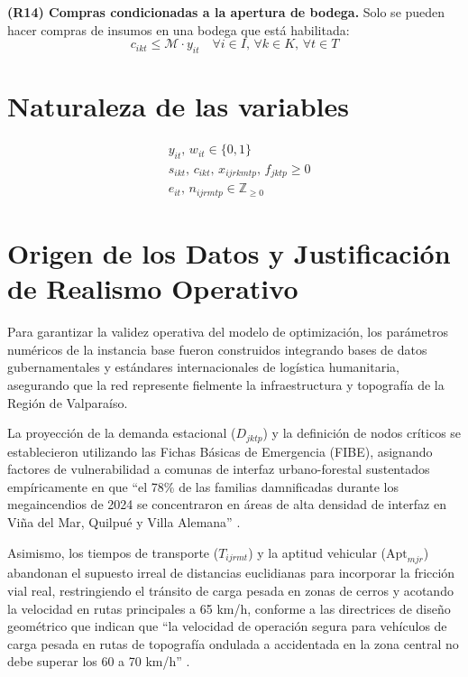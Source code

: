 \documentclass[letterpaper]{article}
\begin{document}
\begin{flushleft}
\textbf{(R14) Compras condicionadas a la apertura de bodega.} Solo se pueden hacer compras de insumos en una bodega que est\'a habilitada:
\begin{equation}
c_{ikt} \leq \mathcal{M} \cdot y_{it} \quad \forall i \in I,\, \forall k \in K,\, \forall t \in T
\end{equation}

\section{Naturaleza de las variables}

\begin{align*}
& y_{it},\, w_{it} \in \{0,1\} \\
& s_{ikt},\, c_{ikt},\, x_{ijrkmtp},\, f_{jktp} \geq 0 \\
& e_{it},\, n_{ijrmtp} \in \mathbb{Z}_{\geq 0}
\end{align*}

\section{Origen de los Datos y Justificaci\'on de Realismo Operativo}

Para garantizar la validez operativa del modelo de optimizaci\'on, los par\'ametros num\'ericos de la instancia base fueron construidos integrando bases de datos gubernamentales y est\'andares internacionales de log\'istica humanitaria, asegurando que la red represente fielmente la infraestructura y topograf\'ia de la Regi\'on de Valpara\'iso.

La proyecci\'on de la demanda estacional ($D_{jktp}$) y la definici\'on de nodos cr\'iticos se establecieron utilizando las Fichas B\'asicas de Emergencia (FIBE), asignando factores de vulnerabilidad a comunas de interfaz urbano-forestal sustentados emp\'iricamente en que ``el 78\% de las familias damnificadas durante los megaincendios de 2024 se concentraron en \'areas de alta densidad de interfaz en Vi\~na del Mar, Quilpu\'e y Villa Alemana'' \cite{mdsf2024fibe}.

Asimismo, los tiempos de transporte ($T_{ijrmt}$) y la aptitud vehicular ($\mathrm{Apt}_{mjr}$) abandonan el supuesto irreal de distancias euclidianas para incorporar la fricci\'on vial real, restringiendo el tr\'ansito de carga pesada en zonas de cerros y acotando la velocidad en rutas principales a 65 km/h, conforme a las directrices de dise\~no geom\'etrico que indican que ``la velocidad de operaci\'on segura para veh\'iculos de carga pesada en rutas de topograf\'ia ondulada a accidentada en la zona central no debe superar los 60 a 70 km/h'' \cite{mop2020}.


\end{flushleft}
\end{document}
